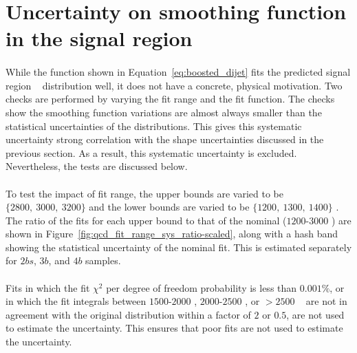 \section{Uncertainty on smoothing function in the signal region}
\label{unc-smooth-qcd-in-sr}

\paragraph{} 
While the function shown in Equation~\ref{eq:boosted_dijet} fits the predicted signal region \mtwoJ~ distribution well, it does not have a concrete, physical motivation.
Two checks are performed by varying the fit range and the fit function.
The checks show the smoothing function variations are almost always smaller than the statistical uncertainties of the distributions.
This gives this systematic uncertainty strong correlation with the shape uncertainties discussed in the previous section.
As a result, this systematic uncertainty is excluded.
Nevertheless, the tests are discussed below.

\paragraph{}
To test the impact of fit range, the upper bounds are varied to be $\{2800,\ 3000,\ 3200\}$ \GeV and the lower bounds are varied to be $\{1200,\ 1300,\ 1400\}$ \GeV.  
The ratio of the fits for each upper bound to that of the nominal ($1200$-$3000$ \GeV) are shown in Figure~\ref{fig:qcd_fit_range_sys_ratio-scaled}, along with a hash band showing the statistical uncertainty of the nominal fit.
This is estimated separately for $2bs$, $3b$, and $4b$ samples.

\paragraph{}
Fits in which the fit $\chi^2$ per degree of freedom probability is less than $0.001\%$, or in which the fit integrals between $1500$-$2000$ \GeV, $2000$-$2500$ \GeV, or $>2500$ \GeV~ are not in agreement with the original distribution within a factor of $2$ or $0.5$, are not used to estimate the uncertainty. This ensures that poor fits are not used to estimate the uncertainty.

